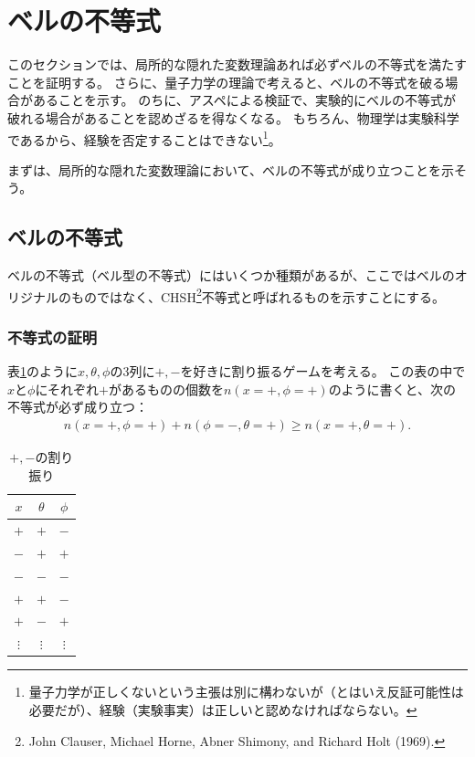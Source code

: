 \documentclass[10pt,b5paper,papersize,dvipdfmx]{jsbook}
\newcommand\hyo[1]{表\ref{tab:#1}}
\begin{document}
\fi
\ifsecII
\section{ベルの不等式}

このセクションでは、局所的な隠れた変数理論あれば必ずベルの不等式を満たすことを証明する。
さらに、量子力学の理論で考えると、ベルの不等式を破る場合があることを示す。
のちに、アスペによる検証で、実験的にベルの不等式が破れる場合があることを認めざるを得なくなる。
もちろん、物理学は実験科学であるから、経験を否定することはできない\footnote{
  量子力学が正しくないという主張は別に構わないが（とはいえ反証可能性は必要だが）、経験（実験事実）は正しいと認めなければならない。
}。\par
まずは、局所的な隠れた変数理論において、ベルの不等式が成り立つことを示そう。

%
\subsection{ベルの不等式} %

ベルの不等式（ベル型の不等式）にはいくつか種類があるが、ここではベルのオリジナルのものではなく、CHSH\footnote{
  John Clauser, Michael Horne, Abner Shimony, and Richard Holt (1969).
}不等式と呼ばれるものを示すことにする。


%
\subsubsection{不等式の証明}
\hyo{pm}のように$x, \theta, \phi$の3列に$+, -$を好きに割り振るゲームを考える。
この表の中で$x$と$\phi$にそれぞれ$+$があるものの個数を$n(x=+,\phi=+)$のように書くと、次の不等式が必ず成り立つ：
\begin{align}
  n(x=+,\phi=+) + n(\phi=-,\theta=+) \ge n(x=+,\theta=+).
  \label{eq:bell's ineq}
\end{align}

\begin{table}[htbp]
  \centering
  \caption{$+, -$の割り振り}
  \label{tab:pm}
  \begin{tabular}{ccc} \hline
    $x$ & $\theta$ & $\phi$ \\ \hline
    $+$ & $+$ & $-$ \\
    $-$ & $+$ & $+$ \\
    $-$ & $-$ & $-$ \\
    $+$ & $+$ & $-$ \\
    $+$ & $-$ & $+$ \\
    $\vdots$ & $\vdots$ & $\vdots$ \\ \hline
  \end{tabular}
\end{table}
\end{document}
